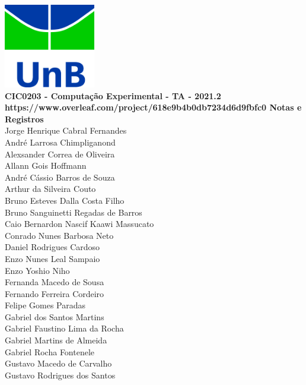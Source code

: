 \documentclass[12pt]{book}
\begin{document}
\clearpage
\thispagestyle{empty}

\begin{titlepage}
\begin{center}
 {\huge\bfseries \includegraphics[width=4cm]{unb-logo.jpg}\\
	CIC0203 - Computação Experimental - TA - 2021.2\\https://www.overleaf.com/project/618e9b4b0db7234d6d9fbfc0
	Notas e Registros\\}
 \vspace{1.5cm}
{\large	%
	Jorge Henrique Cabral Fernandes}\\
	André Larrosa Chimpliganond\\
	Alexsander Correa de Oliveira\\
	Allann Gois Hoffmann\\
	André Cássio Barros de Souza\\
	Arthur da Silveira Couto\\
	Bruno Esteves Dalla Costa Filho\\
	Bruno Sanguinetti Regadas de Barros\\
	Caio Bernardon Nascif Kaawi Massucato\\
	Conrado Nunes Barbosa Neto\\
	Daniel Rodrigues Cardoso\\
	Enzo Nunes Leal Sampaio\\
	Enzo Yoshio Niho\\
	Fernanda Macedo de Sousa \\
	Fernando Ferreira Cordeiro \\
	Felipe Gomes Paradas\\
	Gabriel dos Santos Martins\\
	Gabriel Faustino Lima da Rocha\\
	Gabriel Martins de Almeida\\
	Gabriel Rocha Fontenele\\
	Gustavo Macedo de Carvalho\\
	Gustavo Rodrigues dos Santos \\

\end{center}
\end{titlepage}
\end{document}
